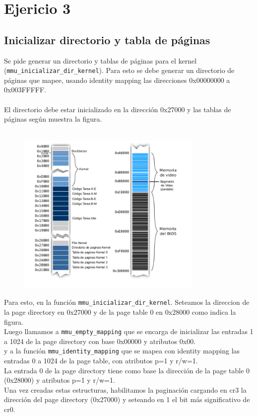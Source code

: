 \section{Ejericio 3}

\subsection{Inicializar directorio y tabla de páginas}

Se pide generar un directorio y tablas de páginas para el kernel (\texttt{mmu\_inicializar\_dir\_kernel}). Para esto se debe generar un directorio de páginas que mapee, usando identity mapping las direcciones 0x00000000 a 0x003FFFFF.\\\\
El directorio debe estar inicializado en la dirección 0x27000 y las tablas de páginas según muestra la figura.\\\\

\begin{figure}[ht]
\centering
\includegraphics[width=90mm]{ej_3/img_ej_3.png}
\end{figure}

Para esto, en la función \texttt{mmu\_inicializar\_dir\_kernel}. Seteamos la direccion de la page directory en 0x27000 y de la page table 0 en 0x28000 como indica la figura.\\

Luego llamamos a \texttt{mmu\_empty\_mapping} que se encarga de inicializar las entradas 1 a 1024 de la page directory con base 0x00000 y atributos 0x00.\\
y a la función \texttt{mmu\_identity\_mapping} que se mapea con identity mapping las entradas 0 a 1024 de la page table, con atributos p=1 y r/w=1.\\
La entrada 0 de la page directory tiene como base la dirección de la page table 0 (0x28000) y atributos p=1 y r/w=1.\\

Una vez creadas estas estructuras, habilitamos la paginación cargando en cr3 la dirección del page directory (0x27000) y seteando en 1 el bit más significativo de cr0.\\


